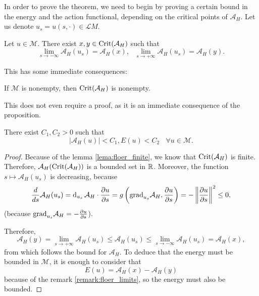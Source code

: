 In order to prove the theorem, we need to begin by proving a certain bound in the energy and the action functional, depending on the critical points of $\mathcal{A}_H$. Let us denote $u_s = u(s,\cdot) \in \mathcal{L}M$.

\begin{prop} \label{prop:floer_action_bound}
Let $u \in \mathcal{M}$. There exist $x,y \in \text{Crit}(\mathcal{A}_H)$ such that
\[\lim_{s \rightarrow -\infty} \mathcal{A}_H(u_s) = \mathcal{A}_H(x), \ \ \ \lim_{s \rightarrow +\infty} \mathcal{A}_H(u_s) = \mathcal{A}_H(y) .\]
\end{prop}

This has some immediate consequences:

\begin{coro}
If $\mathcal{M}$ is nonempty, then $\text{Crit}(\mathcal{A}_H)$ is nonempty.
\end{coro}

This does not even require a proof, as it is an immediate consequence of the proposition.

\begin{coro} \label{coro:floer_energy_bound}
There exist $C_1, C_2 > 0$ such that
\[|\mathcal{A}_H(u)| < C_1 , E(u) < C_2 \ \ \ \ \forall u \in \mathcal{M} .\]
\end{coro}

\begin{proof}
Because of the lemma \ref{lema:floer_finite}, we know that $\text{Crit}(\mathcal{A}_H)$ is finite. Therefore, $\mathcal{A}_H(\text{Crit}(\mathcal{A}_H))$ is a bounded set in $\mathbb{R}$. Moreover, the function $s \mapsto \mathcal{A}_H(u_s)$ is decreasing, because
\[\frac{d}{ds} \mathcal{A}_H(u_s) = \operatorname d_{u_s} \mathcal{A}_H \cdot \frac{\partial u}{\partial s} = g\left( \text{grad}_{u_s} \mathcal{A}_H, \frac{\partial u}{\partial s} \right) = - \left\|\frac{\partial u}{\partial s}\right\|^2 \leq 0 ,\]
(because $\text{grad}_{u_s}\mathcal{A}_H = - \frac{\partial u}{\partial s}$).

Therefore,
\[\mathcal{A}_H(y) = \lim_{s \rightarrow +\infty} \mathcal{A}_H(u_s) \leq \mathcal{A}_H(u_s) \leq \lim_{s \rightarrow -\infty} \mathcal{A}_H(u_s) = \mathcal{A}_H(x) ,\]
from which follows the bound for $\mathcal{A}_H$. To deduce that the energy must be bounded in $\mathcal{M}$, it is enough to consider that
\[E(u) = \mathcal{A}_H(x) - \mathcal{A}_H(y)\]
because of the remark \ref{remark:floer_limits}, so the energy must also be bounded.
\end{proof}

